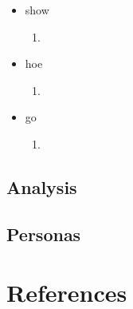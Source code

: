 \documentclass[titlepage]{article}
\begin{document}
\begin{itemize}
                    \item show
                        \begin{enumerate}
                            \item 
                        \end{enumerate}
                    \item hoe
                        \begin{enumerate}
                            \item 
                        \end{enumerate}
                    \item go
                        \begin{enumerate}
                            \item 
                        \end{enumerate}
                \end{itemize}
    
        \subsection{Analysis}
            \blindtext
            
        \subsection{Personas}
            \blindtext

\section{References}


\end{document}

